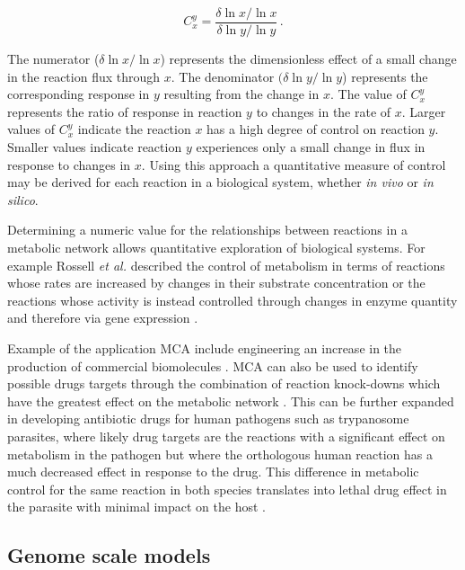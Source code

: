 \begin{equation}\label{fcc}
C_{x}^{y} = \frac{ \delta \ln x / \ln x}{\delta \ln y / \ln y} \, .
\end{equation}

The numerator ($\delta \ln x / \ln x$) represents the dimensionless effect of a small change in the reaction flux through $x$. The denominator $(\delta \ln y / \ln y$) represents the corresponding response in $y$ resulting from the change in $x$. The value of $C_{x}^{y}$ represents the ratio of response in reaction $y$ to changes in the rate of $x$. Larger values of $C_{x}^{y}$ indicate the reaction $x$ has a high degree of control on reaction $y$. Smaller values indicate reaction $y$ experiences only a small change in flux in response to changes in $x$. Using this approach a quantitative measure of control may be derived for each reaction in a biological system, whether \emph{in vivo} or \emph{in silico}.

Determining a numeric value for the relationships between reactions in a metabolic network allows quantitative exploration of biological systems. For example Rossell \emph{et al.} described the control of metabolism in terms of reactions whose rates are increased by changes in their substrate concentration or the reactions whose activity is instead controlled through changes in enzyme quantity and therefore via gene expression \cite{rossell2006,daran-lapujade2007}.

Example of the application MCA include engineering an increase in the production of commercial biomolecules \cite{niederberger1992}. MCA can also be used to identify possible drugs targets through the combination of reaction knock-downs which have the greatest effect on the metabolic network \cite{lehar2008,hopkins2008}. This can be further expanded in developing antibiotic drugs for human pathogens such as trypanosome parasites, where likely drug targets are the reactions with a significant effect on metabolism in the pathogen but where the orthologous human reaction has a much decreased effect in response to the drug. This difference in metabolic control for the same reaction in both species translates into lethal drug effect in the parasite with minimal impact on the host \cite{hornberg2007}.


\subsection{Genome scale models}%

